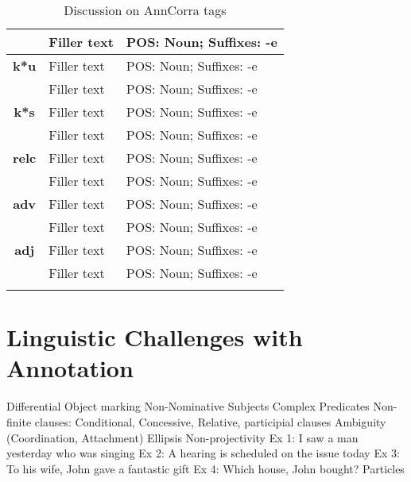 \documentclass[a4 paper]{article}
\begin{document}
\begin{longtable}{cp{}p{}}
                 & Filler text
                 & POS: Noun; Suffixes: -e\\
    \midrule
    \addlinespace[0.5em]
    \textbf{k*u}
                 & Filler text
                 & POS: Noun; Suffixes: -e\\
    \addlinespace[0.5em]
                 & Filler text
                 & POS: Noun; Suffixes: -e\\
    \midrule
    \addlinespace[0.5em]
    \textbf{k*s}
                 & Filler text
                 & POS: Noun; Suffixes: -e\\
    \addlinespace[0.5em]
                 & Filler text
                 & POS: Noun; Suffixes: -e\\
    \midrule
    \addlinespace[0.5em]
    \textbf{relc}
                 & Filler text
                 & POS: Noun; Suffixes: -e\\
    \addlinespace[0.5em]
                 & Filler text
                 & POS: Noun; Suffixes: -e\\
    \midrule
    \addlinespace[0.5em]
    \textbf{adv}
                 & Filler text
                 & POS: Noun; Suffixes: -e\\
    \addlinespace[0.5em]
                 & Filler text
                 & POS: Noun; Suffixes: -e\\
    \midrule
    \addlinespace[0.5em]
    \textbf{adj}
                 & Filler text
                 & POS: Noun; Suffixes: -e\\
    \addlinespace[0.5em]
                 & Filler text
                 & POS: Noun; Suffixes: -e\\
    \midrule
\caption{Discussion on AnnCorra tags}
\label{tab:anncorratable}
\end{longtable}

\section{Linguistic Challenges with Annotation}

 Differential Object marking
 Non-Nominative Subjects
 Complex Predicates
 Non-finite clauses: Conditional, Concessive, Relative, participial clauses
 Ambiguity (Coordination, Attachment)
 Ellipsis
 Non-projectivity
	Ex 1: I saw a man yesterday who was singing
	Ex 2: A hearing is scheduled on the issue today
	Ex 3: To his wife, John gave a fantastic gift
	Ex 4: Which house, John bought?
 Particles
\end{document}
